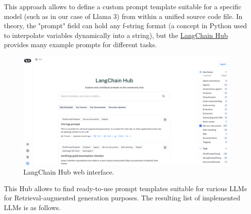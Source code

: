 This approach allows to define a custom prompt template suitable for a specific model (such as in our case of Llama 3) from within a unified source code file. In theory, the "prompt" field can hold any f-string format (a concept in Python used to interpolate variables dynamically into a string), but the \href{https://smith.langchain.com/hub}{LangChain Hub} provides many example prompts for different tasks.
\begin{figure}[H]
    \centering
    \includegraphics[width=\linewidth]{./figures/langchain-hub.png}
    \caption{LangChain Hub web interface.}
\end{figure}
This Hub allows to find ready-to-use prompt templates suitable for various LLMs for Retrieval-augmented generation purposes.\medskip\newline
The resulting list of implemented LLMs is as follows.
